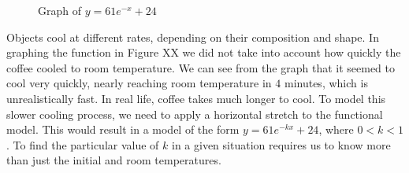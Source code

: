 \documentclass[10pt,]{book}
\theoremstyle{ptxdefinitionnotitle}
\theoremstyle{ptxdefinitiontitle}
\theoremstyle{ptxdefinitionnotitle}
\theoremstyle{ptxdefinitiontitle}
\theoremstyle{ptxdefinitionnotitle}
\theoremstyle{ptxdefinitiontitle}
\numberwithin{equation}{section}
\newcommand{\lt}{<}
\begin{document}
\begin{example}
\begin{figure}
{
}
\caption{Graph of \(y= 61e^{-x}+24\)\label{figure-cooling-coffee}}
\end{figure}
\hypertarget{p-244}{}%
Objects cool at different rates, depending on their composition and shape. In graphing the function in Figure XX we did not take into account how quickly the coffee cooled to room temperature. We can see from the graph that it seemed to cool very quickly, nearly reaching room temperature in \(4\) minutes, which is unrealistically fast.  In real life, coffee takes much longer to cool.  To model this slower cooling process, we need to apply a horizontal stretch to the functional model.  This would result in a model of the form \(y=61e^{-kx}+24\), where \(0 \lt k \lt 1\).  To find the particular value of \(k\) in a given situation requires us to know more than just the initial and room temperatures.%
\end{example}
\end{document}
